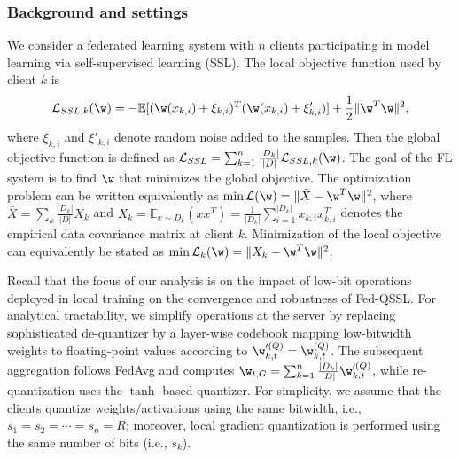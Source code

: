 \documentclass[a4paper,11pt]{article}
\begin{document}
\subsubsection*{Background and settings}


We consider a federated learning system with $n$ clients participating in model learning via self-supervised learning (SSL). The local objective function used by client $k$ is
\begin{align*}
    \mathcal{L}_{SSL, k}(\w) = -\mathbb{E}[(\w(x_{k, i}) +\xi_{k, i})^T(\w(x_{k, i}) +\xi'_{k, i})] + \frac{1}{2} \|\w^T \w \|^2,
\end{align*}
where $\xi_{k, i}$ and $\xi'_{k, i} $ denote random noise added to the samples. Then the global objective function is defined as $\mathcal{L}_{SSL} = \sum_{k=1}^n \frac{|D_k|}{|D|}\mathcal{L}_{SSL, k}(\w)$. The goal of the FL system is to find $\w$ that minimizes the global objective. The optimization problem can be written equivalently as $\min \mathcal{L}(\w) = \|\bar{X} - \w^T \w \|^2$, where $\bar{X} = \sum_k \frac{|D_k|}{|D|}X_k$ and $X_k = \mathbb{E}_{x \sim D_k}(xx^T) = \frac{1}{|D_k|}\sum_{i=1}^{|D_k|} x_{k, i}x_{k, i}^T$ denotes the empirical data covariance matrix at client $k$. Minimization of the local objective can equivalently be stated as $\min \mathcal{L}_{k}(\w) = \|X_k - \w^T \w\|^2$. 

Recall that the focus of our analysis is on the impact of low-bit operations deployed in local training on the convergence and robustness of Fed-QSSL. For analytical tractability, we simplify operations at the server by replacing sophisticated de-quantizer by a layer-wise codebook mapping low-bitwidth weights to floating-point values according to $\w'^{(Q)}_{k, t} = \w^{(Q)}_{k, t}$. The subsequent aggregation follows FedAvg and computes $\w_{t, G} = \sum_{k=1}^n \frac{|D_k|}{|D|} \w'^{(Q)}_{k, t}$, while re-quantization uses the $\tanh$-based quantizer. For simplicity, we assume that the clients quantize weights/activations using the same bitwidth, i.e., $s_1 = s_2 = \cdots = s_n = R$; moreover, local gradient quantization is performed using the same number of bits (i.e., $s_k$). 
\end{document}
